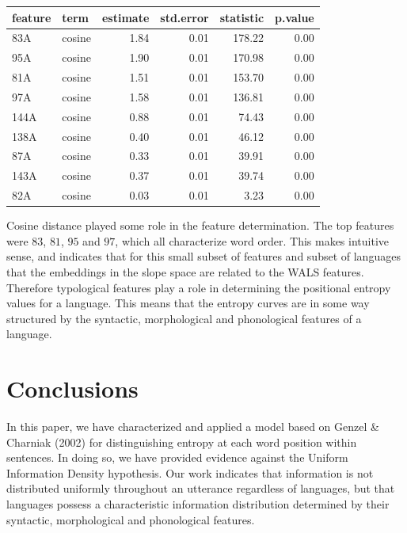 \documentclass[10pt, letterpaper]{article}
\begin{document}
\begin{table}[tb]
\centering
\begin{tabular}{llrrrr}
  \hline
feature & term & estimate & std.error & statistic & p.value \\ 
  \hline
83A & cosine & 1.84 & 0.01 & 178.22 & 0.00 \\ 
  95A & cosine & 1.90 & 0.01 & 170.98 & 0.00 \\ 
  81A & cosine & 1.51 & 0.01 & 153.70 & 0.00 \\ 
  97A & cosine & 1.58 & 0.01 & 136.81 & 0.00 \\ 
  144A & cosine & 0.88 & 0.01 & 74.43 & 0.00 \\ 
  138A & cosine & 0.40 & 0.01 & 46.12 & 0.00 \\ 
  87A & cosine & 0.33 & 0.01 & 39.91 & 0.00 \\ 
  143A & cosine & 0.37 & 0.01 & 39.74 & 0.00 \\ 
  82A & cosine & 0.03 & 0.01 & 3.23 & 0.00 \\ 
   \hline
\end{tabular}
\end{table}

Cosine distance played some role in the feature determination. The top
features were \(83\), \(81\), \(95\) and \(97\), which all characterize
word order. This makes intuitive sense, and indicates that for this
small subset of features and subset of languages that the embeddings in
the slope space are related to the WALS features. Therefore typological
features play a role in determining the positional entropy values for a
language. This means that the entropy curves are in some way structured
by the syntactic, morphological and phonological features of a language.

\section{Conclusions}\label{conclusions}

In this paper, we have characterized and applied a model based on Genzel
\& Charniak (2002) for distinguishing entropy at each word position
within sentences. In doing so, we have provided evidence against the
Uniform Information Density hypothesis. Our work indicates that
information is not distributed uniformly throughout an utterance
regardless of languages, but that languages possess a characteristic
information distribution determined by their syntactic, morphological
and phonological features.
\end{document}
